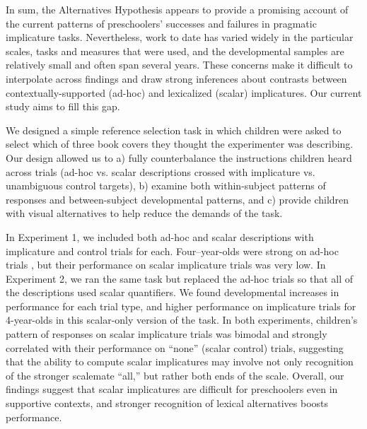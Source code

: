 \documentclass[10pt,letterpaper]{article}
\begin{document}
In sum, the Alternatives Hypothesis appears to provide a promising account of the current patterns of preschoolers' successes and failures in pragmatic implicature tasks. Nevertheless, work to date has varied widely in the particular scales, tasks and measures that were used, and the developmental samples are relatively small and often span several years. These concerns make it difficult to interpolate across findings and draw strong inferences about contrasts between contextually-supported (ad-hoc) and lexicalized (scalar) implicatures. Our current study aims to fill this gap. 

We designed a simple reference selection task in which children were asked to select which of three book covers they thought the experimenter was describing. Our design allowed us to a) fully counterbalance the instructions children heard across trials (ad-hoc vs. scalar descriptions crossed with implicature vs. unambiguous control targets), b) examine both within-subject patterns of responses and between-subject developmental patterns, and c) provide children with visual alternatives to help reduce the demands of the task.

In Experiment 1, we included both ad-hoc and scalar descriptions with implicature and control trials for each. Four--year-olds were strong on ad-hoc trials \citep[similar to previous work, e.g.][]{stiller2014}, but their performance on scalar implicature trials was very low. In Experiment 2, we ran the same task but replaced the ad-hoc trials so that all of the descriptions used scalar quantifiers. We found developmental increases in performance for each trial type, and higher performance on implicature trials for 4-year-olds in this scalar-only version of the task. In both experiments, children's pattern of responses on scalar implicature trials was bimodal and strongly correlated with their performance on ``none'' (scalar control) trials, suggesting that the ability to compute scalar implicatures may involve not only recognition of the stronger scalemate ``all,'' but rather both ends of the scale. Overall, our findings suggest that scalar implicatures are difficult for preschoolers even in supportive contexts, and stronger recognition of lexical alternatives boosts performance. 

\end{document}
